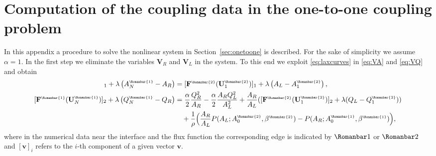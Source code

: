 \documentclass[a4paper,11pt]{article}
\newcommand{\Rmn}[1]{\Romanbar #1}
\newcommand{\rmn}[1]{\text{\tiny \Romanbar{#1}}}
\begin{document}
\section{Computation of the coupling data in the one-to-one coupling problem}\label{sec:algo}
In this appendix a procedure to solve the nonlinear system in Section~\ref{sec:onetoone} is described. For the sake of simplicity we assume $\alpha=1$. In the first step we eliminate the variables $\mathbf V_R$ and $\mathbf V_L$ in the system. To this end we exploit \eqref{eq:laxcurves} in \eqref{eq:VA} and \eqref{eq:VQ} and obtain
\begin{align}
  [\mathbf F^{\rmn{1}}(\mathbf U_N^{\rmn{1}})]_1+ \lambda \left(A_N^{\rmn{1}} -A_R \right) &= [\mathbf F^{\rmn{2}}(\mathbf U_1^{\rmn{2}})]_1 + \lambda \left( A_L - A_1^{\rmn{2}} \right), \label{eq:VAmod}\\
  [\mathbf F^{\rmn{1}}(\mathbf U_N^{\rmn{1}})]_2 + \lambda \left( Q_N^{\rmn{1}} - Q_R \right)&= \frac{\alpha}{2} \frac{Q_R^2}{A_R} - \frac{\alpha}{2} \frac{A_R Q_L^2}{A_L^2} + \frac{A_R}{A_L} ([\mathbf F^{\rmn{2}}(\mathbf U_1^{\rmn{2}})]_2+\lambda(Q_L-Q_1^{\rmn{2}})) \notag\\
                                        &\quad  +  \frac{1}{\rho} \Bigl(\frac{A_R}{A_L}  P(A_L; A_0^{\rmn{2}}, \beta^{\rmn{2}})  - P(A_R; A_0^{\rmn{1}}, \beta^{\rmn{1}}) \Bigr), \label{eq:VQmod} 
\end{align}
where in the numerical data near the interface and the flux function the corresponding edge is indicated by $\Rmn{1}$ or $\Rmn{2}$ and $[\mathbf v]_i$ refers to the $i$-th component of a given vector $\mathbf v$.
\end{document}
